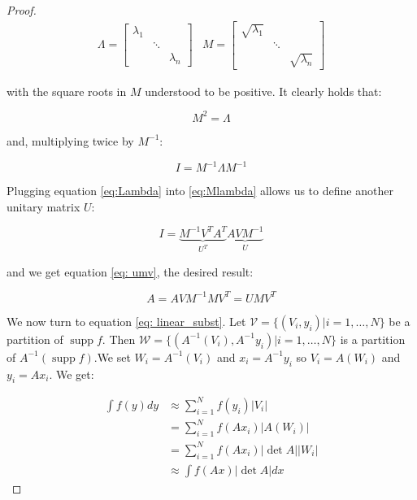 \documentclass{article}
\DeclareMathOperator\supp{supp}
\begin{document}
\begin{proof}
\begin{equation*}
\begin{array}{cc}
\Lambda = \left[
    \begin{array}{ccc}
        \lambda_{1}&   \\
            & \ddots  \\
            && \lambda_{n}
    \end{array}
\right]
& M = \left[
    \begin{array}{ccc}
        \sqrt{\lambda_{1}}&   \\
            & \ddots  \\
            && \sqrt{\lambda_{n}}
    \end{array}
\right]
\end{array}
\end{equation*}

with the square roots in $M$ understood to be positive. It clearly holds that:

\begin{equation*}
M^2 = \Lambda
\end{equation*}

and, multiplying twice by $M^{-1}$:

\begin{equation} \label{eq:Mlambda}
I = M^{-1}\Lambda M^{-1}
\end{equation}

Plugging equation \ref{eq:Lambda} into \ref{eq:Mlambda} allows us to define another unitary matrix $U$:

\begin{equation*}
I = \underbrace{M^{-1} V^{T}A^T}_{U^T}\underbrace{AV M^{-1}}_{U}
\end{equation*}

and we get equation \ref{eq: umv}, the desired result:

\begin{equation*}
A = AVM^{-1}M V^T = UMV^T
\end{equation*}

We now turn to equation \ref{eq: linear_subst}. Let
$ \mathcal{V} = \{(V_i, y_i) | i = 1, \hdots, N\}$
be a partition of $\supp{f}$. Then $\mathcal{W} = \{(A^{-1}(V_i), A^{-1}y_i) | i = 1, \hdots, N\}$ is a partition of $A^{-1}(\supp{f})$.We set $W_i = A^{-1}(V_i)$ and $x_i = A^{-1}y_i $ so $V_i = A(W_i)$ and $y_i = Ax_i$. We get:


\begin{equation*}
\begin{split}
\int f(y) dy &\approx \sum_{i = 1}^{N} f(y_i) \lvert V_i \rvert \\ 
             &= \sum_{i = 1}^{N} f(Ax_i) \lvert A(W_i) \rvert \\
             &= \sum_{i = 1}^{N} f(Ax_i) \lvert \det{A} \rvert \lvert W_i \rvert \\
             &\approx \int f(Ax) \lvert \det{A} \rvert dx
\end{split}              
\end{equation*}

\end{proof}
\end{document}
